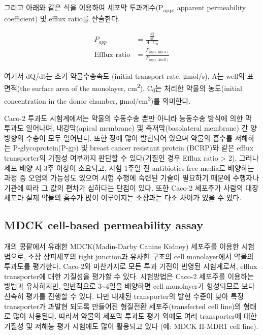 \documentclass[
  11pt,
  krantz2, a4paper, twoside]{krantz}
\begin{document}
그리고 아래와 같은 식을 이용하여 세포막 투과계수(P\textsubscript{app}, apparent
permeability coefficient) 및 efflux ratio를 산출한다.

\begin{equation}
\begin{split}
P_{app} &= \frac{\frac{dQ}{dt}}{A \cdot C_0} \\
\text{Efflux ratio} &= \frac{P_{app (B to A)}}{P_{app (A to B)}}
\end{split}
\label{eq:eq02-02} 
\end{equation}

여기서 dQ/dt는 초기 약물수송속도 (initial transport rate, μmol/s), A는
well의 표면적(the surface area of the monolayer, cm\textsuperscript{2}), C\textsubscript{0}는 처리한
약물의 농도(initial concentration in the donor chamber, μmol/cm\textsuperscript{3})를
의미한다.

Caco-2 투과도 시험계에서는 약물의 수동수송 뿐만 아니라 능동수송 방식에
의한 막 투과도 일어나며, 내강막(apical membrane) 및 측저막(basolateral
membrane) 간 양방향의 수송이 모두 일어난다. 또한 장에 많이 발현되어
있으며 약물의 흡수를 저해하는 P-glycoprotein(P-gp) 및 breast cancer
resistant protein (BCRP)와 같은 efflux transporter의 기질성 여부까지
판단할 수 있다(기질인 경우 Efflux ratio \textgreater{} 2). 그러나 세포 배양 시 3주
이상이 소요되고, 시험 1주일 전 antibiotics-free media로 배양하는 과정 중
오염의 가능성도 있으며 시험 수행에 숙련된 기술이 필요하기 때문에
수행자나 기관에 따라 그 값의 편차가 심하다는 단점이 있다. 또한 Caco-2
세포주가 사람의 대장세포라 실제 약물의 흡수가 많이 이루어지는 소장과는
다소 차이가 있을 수 있다.

\subsection{MDCK cell-based permeability assay}\label{mdck-cell-based-permeability-assay}

개의 콩팥에서 유래한 MDCK(Madin-Darby Canine Kidney) 세포주를 이용한
시험법으로, 소장 상피세포의 tight junction과 유사한 구조의 cell
monolayer에서 약물의 투과도를 평가한다. Caco-2와 마찬가지로 모든 투과
기전이 반영된 시험계로서, efflux transporter에 대한 기질성을 평가할 수
있다. 시험방법은 Caco-2 세포주를 이용하는 방법과 유사하지만, 일반적으로
3\textasciitilde4일을 배양하면 cell monolayer가 형성되므로 보다 신속히 평가를 진행할
수 있다. 다만 내재된 transporter의 발현 수준이 낮아 특정 transporter가
과발현 되도록 만들어진 형질전환 세포주(transfected cell line)의 형태로
많이 사용된다. 따라서 약물의 세포막 투과도 평가 외에도 여러
transporter에 대한 기질성 및 저해능 평가 시험에도 많이 활용되고 있다
(예: MDCK II-MDR1 cell line).
\end{document}
